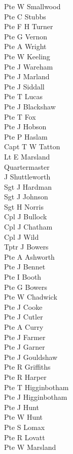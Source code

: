 \begin{multicols}{3}
  Pte W Smallwood \\
  Pte C Stubbs \\
  Pte F H Turner \\
  Pte G Vernon \\
  Pte A Wright \\
  Pte W Keeling \\
  Pte J Wareham \\
  Pte J Marland \\
  Pte J Siddall \\
  Pte T Lucas \\
  Pte J Blackshaw \\
  Pte T Fox \\
  Pte J Hobson \\
  Pte P Haslam \\
  Capt T W Tatton \\
  Lt E Marsland \\
  Quartermaster \\ \indent J Shuttleworth \\
  Sgt J Hardman \\
  Sgt J Johnson \\
  Sgt H Norris \\
  Cpl J Bullock \\
  Cpl J Chatham \\
  Cpl J Wild \\
  Tptr J Bowers \\
  Pte A Ashworth \\
  Pte J Bennet \\
  Pte I Booth \\
  Pte G Bowers \\
  Pte W Chadwick \\
  Pte J Cooke \\
  Pte J Cutler \\
  Pte A Curry \\
  Pte J Farmer \\
  Pte J Garner \\
  Pte J Gouldshaw \\
  Pte R Griffiths \\
  Pte R Harper \\
  Pte T Higginbotham \\
  Pte J Higginbotham \\
  Pte J Hunt \\
  Pte W Hunt \\
  Pte S Lomax \\
  Pte R Lovatt \\
  Pte W Marsland \\

\end{multicols}
